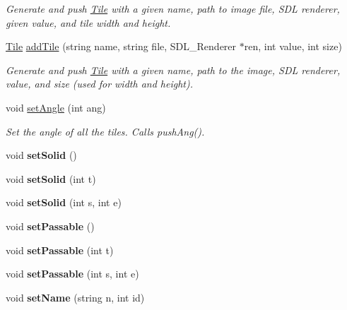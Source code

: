 \begin{DoxyCompactItemize}
\begin{DoxyCompactList}\small\item\em Generate and push \hyperlink{classTile}{Tile} with a given name, path to image file, S\+DL renderer, given value, and tile width and height. \end{DoxyCompactList}\item 
\hyperlink{classTile}{Tile} \hyperlink{classTileset_adc54ffeda362f79668abb0bad2f73296}{add\+Tile} (string name, string file, S\+D\+L\+\_\+\+Renderer $\ast$ren, int value, int size)\hypertarget{classTileset_adc54ffeda362f79668abb0bad2f73296}{}\label{classTileset_adc54ffeda362f79668abb0bad2f73296}

\begin{DoxyCompactList}\small\item\em Generate and push \hyperlink{classTile}{Tile} with a given name, path to the image, S\+DL renderer, value, and size (used for width and height). \end{DoxyCompactList}\item 
void \hyperlink{classTileset_ab1dab8dd83a80e5d49dcdb95f9841898}{set\+Angle} (int ang)\hypertarget{classTileset_ab1dab8dd83a80e5d49dcdb95f9841898}{}\label{classTileset_ab1dab8dd83a80e5d49dcdb95f9841898}

\begin{DoxyCompactList}\small\item\em Set the angle of all the tiles. Calls push\+Ang(). \end{DoxyCompactList}\item 
void {\bfseries set\+Solid} ()\hypertarget{classTileset_a87978787ae2529b915c0436b5872dd48}{}\label{classTileset_a87978787ae2529b915c0436b5872dd48}

\item 
void {\bfseries set\+Solid} (int t)\hypertarget{classTileset_aa4dd63b2c6422ed5a9b7d772963fe255}{}\label{classTileset_aa4dd63b2c6422ed5a9b7d772963fe255}

\item 
void {\bfseries set\+Solid} (int s, int e)\hypertarget{classTileset_a6d40a14146a3dedd0217a412a66f4c9a}{}\label{classTileset_a6d40a14146a3dedd0217a412a66f4c9a}

\item 
void {\bfseries set\+Passable} ()\hypertarget{classTileset_a9fc3756317f238121769629ea20a9849}{}\label{classTileset_a9fc3756317f238121769629ea20a9849}

\item 
void {\bfseries set\+Passable} (int t)\hypertarget{classTileset_a231401092d65e28b7dea12e97e3232ad}{}\label{classTileset_a231401092d65e28b7dea12e97e3232ad}

\item 
void {\bfseries set\+Passable} (int s, int e)\hypertarget{classTileset_a84b12096b06c7162ca4bb9058a232d21}{}\label{classTileset_a84b12096b06c7162ca4bb9058a232d21}

\item 
void {\bfseries set\+Name} (string n, int id)\hypertarget{classTileset_ad5f3a60a84cec25c6e11856a7cd36d84}{}\label{classTileset_ad5f3a60a84cec25c6e11856a7cd36d84}

\end{DoxyCompactItemize}
